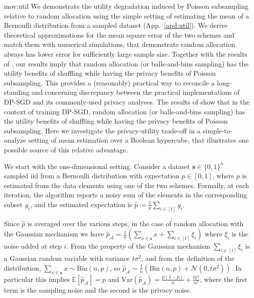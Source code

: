 \documentclass{article}
\newcommand{\Arxiv}[1]{}
\newcommand{\Arxiv}[1]{#1}
\theoremstyle{plain}
\theoremstyle{definition}
\newcommand{\out}{y}
\newcommand{\dataset}{\boldsymbol{s}}
\begin{document}
\Arxiv{\subsection{Privacy-utility tradeoff}\label{apd:util}}
\begin{movable}{mov:util}
{
We demonstrate the utility degradation induced by Poisson subsampling relative to random allocation using the simple setting of estimating the mean of a Bernoulli distribution from a sampled dataset (App.~\ref{apd:util}). We derive theoretical approximations for the mean square error of the two schemes and match them with numerical simulations, that demonstrate random allocation always has lower error for sufficiently large sample size. Together with the results of \citet{CGHLKKMSZ24}, our results imply that random allocation (or balls-and-bins sampling) has the utility benefits of shuffling while having the privacy benefits of Poisson subsampling.  This provides a (reasonably) practical way to reconcile a long-standing and concerning discrepancy between the practical implementations of DP-SGD and its commonly-used privacy analyses. 
}
The results of \citet{CGHLKKMSZ24} show that in the context of training DP-SGD, random allocation (or balls-and-bins sampling) has the utility benefits of shuffling while having the privacy benefits of Poisson subsampling. Here we investigate the privacy-utility trade-off in a simple-to-analyze setting of mean estimation over a Boolean hypercube, that illustrates one possible source of this relative advantage.

We start with the one-dimensional setting. Consider a dataset $\dataset \in \{0,1\}^{n}$ sampled iid from a Bernoulli distribution with expectation $p \in [0,1]$, where $p$ is estimated from the data elements using one of the two schemes. Formally, at each iteration, the algorithm reports a noisy sum of the elements in the corresponding subset $\out_{i}$, and the estimated expectation is $\hat{p} \coloneqq \frac{1}{n} \sum_{i \in [t]} \out_{i}$.

Since $\hat{p}$ is averaged over the various steps, in the case of random allocation with the Gaussian mechanism we have $\hat{p}_{\mathcal{A}} = \frac{1}{n}\left(\sum_{x \in \dataset} x + \sum_{i \in [t]} \xi_{i}\right)$ where $\xi_{i}$ is the noise added at step $i$. From the property of the Gaussian mechanism $\sum_{i \in [t]} \xi_{i}$ is a Gaussian random variable with variance $t \sigma^{2}$, and from the definition of the distribution, $\sum_{x \in \dataset} x \sim \text{Bin}(n, p)$, so $\hat{p}_{\mathcal{A}} \sim \frac{1}{n}\left(\text{Bin}(n, p) + \mathcal{N}(0, t \sigma^{2})\right)$. In particular this implies $\mathbb{E}[\hat{p}_{\mathcal{A}}] = p$ and $\text{Var}(\hat{p}_{\mathcal{A}}) = \frac{p(1-p)}{n} + \frac{t \sigma^{2}}{n^{2}}$, where the first term is the sampling noise and the second is the privacy noise.


\end{movable}
\end{document}

